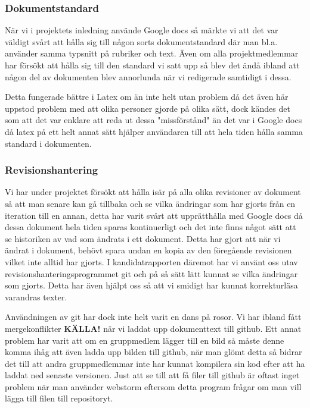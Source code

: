 \subsubsection{Dokumentstandard}
När vi i projektets inledning använde Google docs så märkte vi att det var väldigt svårt att hålla sig till någon sorts dokumentstandard där man bl.a. använder samma typsnitt på rubriker och text. Även om alla projektmedlemmar har försökt att hålla sig till den standard vi satt upp så blev det ändå ibland att någon del av dokumenten blev annorlunda när vi redigerade samtidigt i dessa. 

Detta fungerade bättre i Latex om än inte helt utan problem då det även här uppstod problem med att olika personer gjorde på olika sätt, dock kändes det som att det var enklare att reda ut dessa "missförstånd" än det var i Google docs då latex på ett helt annat sätt hjälper användaren till att hela tiden hålla samma standard i dokumenten.

\subsubsection{Revisionshantering}
Vi har under projektet försökt att hålla isär på alla olika revisioner av dokument så att man senare kan gå tillbaka och se vilka ändringar som har gjorts från en iteration till en annan, detta har varit svårt att upprätthålla med Google docs då dessa dokument hela tiden sparas kontinuerligt och det inte finns något sätt att se historiken av vad som ändrats i ett dokument. Detta har gjort att när vi ändrat i dokument, behövt spara undan en kopia av den föregående revisionen vilket inte alltid har gjorts. I kandidatrapporten däremot har vi använt oss utav revisionshanteringsprogrammet git och på så sätt lätt kunnat se vilka ändringar som gjorts. Detta har även hjälpt oss så att vi smidigt har kunnat korrekturläsa varandras texter. 

Användningen av git har dock inte helt varit en dans på rosor. Vi har ibland fått mergekonflikter \textbf{KÄLLA!} när vi laddat upp dokumenttext till github. Ett annat problem har varit att om en gruppmedlem lägger till en bild så måste denne komma ihåg att även ladda upp bilden till github, när man glömt detta så bidrar det till att andra gruppmedlemmar inte har kunnat kompilera sin kod efter att ha laddat ned senaste versionen. Just att se till att få filer till github är oftast inget problem när man använder webstorm eftersom detta program frågar om man vill lägga till filen till repositoryt.

